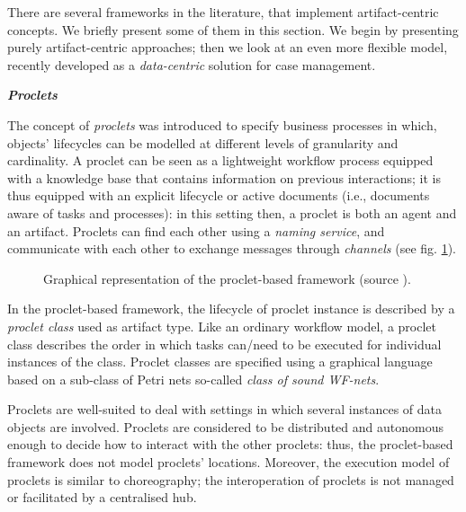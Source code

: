 \label{chap1:sec:existing-artifact-centric-bpm}
There are several frameworks in the literature, that implement artifact-centric concepts. We briefly present some of them in this section. We begin by presenting purely artifact-centric approaches; then we look at an even more flexible model, recently developed as a \textit{data-centric} solution for case management.


\label{chap1:sec:purely-artifact-centric-bpm}
\noindent\textbf{\textit{Proclets \cite{van2001proclets}}}

The concept of \textit{proclets} was introduced to specify business processes in which, objects' lifecycles can be modelled at different levels of granularity and cardinality. A proclet can be seen as a lightweight workflow process equipped with a knowledge base that contains information on previous interactions; it is thus equipped with an explicit lifecycle or active documents (i.e., documents aware of tasks and processes): in this setting then, a proclet is both an agent and an artifact. Proclets can find each other using a \textit{naming service}, and communicate with each other to exchange messages through \textit{channels} (see fig. \ref{chap1:fig:proclet}). 
\begin{figure}[ht!]
	\noindent
	\caption{Graphical representation of the proclet-based framework (source \cite{van2001proclets}).}
	\label{chap1:fig:proclet}
\end{figure}

In the proclet-based framework, the lifecycle of proclet instance is described by a \textit{proclet class} used as artifact type. Like an ordinary workflow model, a proclet class describes the order in which tasks can/need to be executed for individual instances of the class. Proclet classes are specified using a graphical language based on a sub-class of Petri nets so-called \textit{class of sound WF-nets}.

Proclets are well-suited to deal with settings in which several instances of data objects are involved. Proclets are considered to be distributed and autonomous enough to decide how to interact with the other proclets: thus, the proclet-based framework does not model proclets' locations. Moreover, the execution model of proclets is similar to choreography; the interoperation of proclets is not managed or facilitated by a centralised hub.


